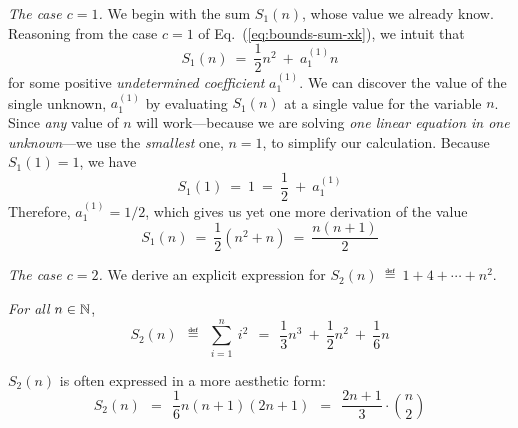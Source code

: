 \medskip

{\it The case $c=1$.}
%
We begin with the sum $S_1(n)$, whose value we already know.  Reasoning from the case $c=1$ of Eq.~(\ref{eq:bounds-sum-xk}), we intuit that
\[ S_1(n) \ = \ \frac{1}{2} n^2 \ + \ a^{(1)}_1 n \]
for some positive {\it undetermined coefficient} $a^{(1)}_1$.  We can discover the value of the single unknown, $a^{(1)}_1$ by evaluating $S_1(n)$ at a single value for the variable $n$.  Since {\em any} value of $n$ will work---because we are solving {\em one linear equation in one unknown}---we use the {\em smallest} one, $n=1$, to simplify our calculation.  Because $S_1(1) = 1$, we have
\[ S_1(1) \ = \ 1 \ = \ \frac{1}{2} \ + \ a^{(1)}_1 \]
Therefore, $a^{(1)}_1 = 1/2$, which gives us yet one more derivation of the value
\[ S_1(n) \ = \ \frac{1}{2} \left( n^2 + n \right) \ = \  \frac{n(n+1)}{2} \]

\medskip

{\it The case $c=2$.}
%
We derive an explicit expression for $S_2(n) \ \eqdef \  1 + 4 + \cdots + n^2$.

\begin{prop}
\label{thm:summing-squares}
{\em For all} $n \in \mathbb{N}$,
\begin{equation}
\label{eq:sum-1-to-nsq}
S_2(n) \ \ \eqdef \ \ \sum_{i=1}^n \ i^2 
\ \ = \ \ \frac{1}{3} n^3 \ + \ \frac{1}{2} n^2 \ + \ \frac{1}{6} n
\end{equation}
\end{prop}

\noindent
$S_2(n)$ is often expressed in a more aesthetic form:
\[ S_2(n) \ \ = \ \
\frac{1}{6} n (n+1)(2n+1) \ \  = \ \
\frac{2n+1}{3} \cdot {n \choose 2}
\]

